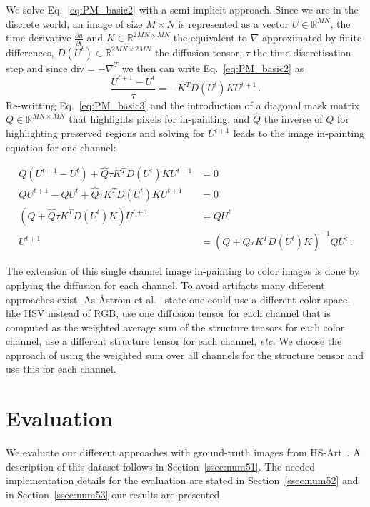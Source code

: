 We solve Eq.~\eqref{eq:PM_basic2} with a semi-implicit approach. Since we are in the discrete world, an image of size $M \times N$ is represented as a vector $U \in \mathbb{R}^{MN}$, the time derivative $\frac{\partial u}{\partial t}$ and $K \in \mathbb{R}^{2MN\times MN}$ the equivalent to $\nabla$ approximated by finite differences, $D(U^t) \in \mathbb{R}^{2MN\times2MN}$ the diffusion tensor, $\tau$ the time discretisation step and since $\text{div} = -\nabla^T$ we then can write Eq.~\eqref{eq:PM_basic2} as
\begin{equation}
\frac{U^{t+1}-U^t}{\tau}=-K^TD(U^t)KU^{t+1}\,.
\label{eq:PM_basic3}
\end{equation}
Re-writting Eq.~\eqref{eq:PM_basic3} and the introduction of a diagonal mask matrix $Q \in \mathbb{R}^{MN \times MN}$ that highlights pixels for in-painting, and $ \hat{Q}$ the inverse of $Q$ for highlighting preserved regions and solving for $U^{t+1}$ leads to the image in-painting equation for one channel:

\begin{equation} \label{eq:PM_final}
\begin{split}
Q(U^{t+1}-U^t)+\hat{Q}\tau K^TD(U^t)K U^{t+1} &= 0 \\
Q U^{t+1}-Q U^t+\hat{Q}\tau K^TD(U^t)K U^{t+1} &= 0 \\
 (Q+\hat{Q} \tau K^TD(U^t)K) U^{t+1} &= Q U^t\\
  U^{t+1} &= (Q+\hat{Q}\tau K^TD(U^t)K)^{-1}QU^t\,.
\end{split}
\end{equation}


The extension of this single channel image in-painting to color images is done by applying the diffusion for each channel. To avoid artifacts many different approaches exist. As {\AA}str{\"o}m et al.~\cite{aastrom11} state one could use a different color space, like HSV instead of RGB, use one diffusion tensor for each channel that is computed as the weighted average sum of the structure tensors for each color channel, use a different structure tensor for each channel, \textit{etc.} We choose the approach of using the weighted sum over all channels for the structure tensor and use this for each channel.



\section{Evaluation}
\label{sec:num5}

We evaluate our different approaches with ground-truth images from HS-Art~\cite{hs-art}. A description of this dataset follows in Section~\ref{ssec:num51}. The needed implementation details for the evaluation are stated in Section~\ref{ssec:num52} and in Section~\ref{ssec:num53} our results are presented.

